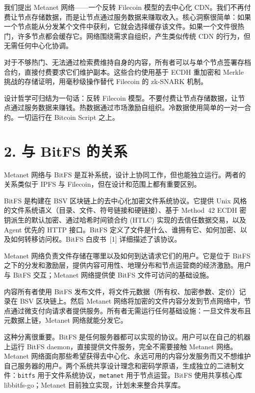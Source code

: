 \documentclass[11pt,a4paper]{article}
\begin{document}
我们提出 Metanet 网络——一个反转 Filecoin 模型的去中心化 CDN。我们不再付费让节点存储数据，而是让节点通过服务数据来赚取收入。核心洞察很简单：如果一个节点能从分发某个文件中获利，它就会选择缓存该文件。如果一个文件很热门，许多节点都会缓存它。网络围绕需求自组织，产生类似传统 CDN 的行为，但无需任何中心化协调。

对于不够热门、无法通过检索费维持自身的内容，所有者可以与单个节点签署存档合约，直接付费要求它们维护副本。这些合约使用基于 ECDH 重加密和 Merkle 挑战的存储证明，用毫秒级操作替代 Filecoin 的 zk-SNARK 机制。

设计哲学可归结为一句话：反转 Filecoin 模型。不要付费让节点存储数据，让节点通过服务数据来赚钱。热数据通过市场激励自组织。冷数据使用简单的一对一合约。一切运行在 Bitcoin Script 之上。

\section{2. 与 BitFS 的关系}

Metanet 网络与 BitFS 是互补系统，设计上协同工作，但也能独立运行。两者的关系类似于 IPFS 与 Filecoin，但在设计和范围上都有重要区别。

BitFS 是构建在 BSV 区块链上的去中心化加密文件系统协议。它提供 Unix 风格的文件系统语义（目录、文件、符号链接和硬链接）、基于 Method~42 ECDH 密钥派生的默认加密、通过哈希时间锁合约 (HTLC) 实现的去信任数据交易，以及 Agent 优先的 HTTP 接口。BitFS 定义了文件是什么、谁拥有它、如何加密、以及如何转移访问权。BitFS 白皮书~[1] 详细描述了该协议。

Metanet 网络负责文件存储在哪里以及如何到达请求它们的用户。它是位于 BitFS 之下的分发和激励层，提供内容可用性、地理分布和节点运营商的经济激励。用户与 BitFS 交互；Metanet 网络提供使 BitFS 文件可访问的基础设施。

内容所有者使用 BitFS 发布文件，将文件元数据（所有权、加密参数、定价）记录在 BSV 区块链上。然后 Metanet 网络将加密的文件内容分发到节点网络中，节点通过微支付向请求者提供服务。所有者无需运行任何基础设施：一旦文件发布且元数据上链，Metanet 网络就能分发它。

这种分离很重要。BitFS 是任何服务器都可以实现的协议。用户可以在自己的机器上运行 BitFS daemon，直接提供文件服务，完全不需要接触 Metanet 网络。Metanet 网络面向那些希望获得去中心化、永远可用的内容分发服务而又不想维护自己服务器的用户。两个系统共享设计理念和密码学原语，生成独立的二进制文件：\texttt{bitfs} 用于文件系统协议，\texttt{metanet} 用于节点运营。BitFS 使用共享核心库 libbitfs-go；Metanet 目前独立实现，计划未来整合共享库。
\end{document}
